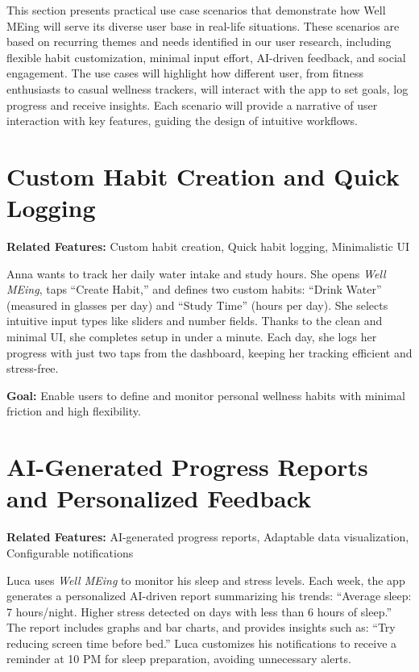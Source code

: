 This section presents practical use case scenarios that demonstrate how Well MEing will serve its diverse user base in real-life situations. 
These scenarios are based on recurring themes and needs identified in our user research, including flexible habit customization, minimal input effort, AI-driven feedback, and social engagement. 
The use cases will highlight how different user, from fitness enthusiasts to casual wellness trackers, will interact with the app to set goals, log progress and receive insights. 
Each scenario will provide a narrative of user interaction with key features, guiding the design of intuitive workflows.

\section{Custom Habit Creation and Quick Logging}

\textbf{Related Features:} Custom habit creation, Quick habit logging, Minimalistic UI

\vspace{0.3cm}
\noindent
Anna wants to track her daily water intake and study hours. She opens \textit{Well MEing}, taps ``Create Habit,'' and defines two custom habits: ``Drink Water'' (measured in glasses per day) and ``Study Time'' (hours per day). She selects intuitive input types like sliders and number fields. Thanks to the clean and minimal UI, she completes setup in under a minute. Each day, she logs her progress with just two taps from the dashboard, keeping her tracking efficient and stress-free.

\vspace{0.2cm}
\noindent
\textbf{Goal:} Enable users to define and monitor personal wellness habits with minimal friction and high flexibility.

\section{AI-Generated Progress Reports and Personalized Feedback}

\textbf{Related Features:} AI-generated progress reports, Adaptable data visualization, Configurable notifications

\vspace{0.3cm}
\noindent
Luca uses \textit{Well MEing} to monitor his sleep and stress levels. Each week, the app generates a personalized AI-driven report summarizing his trends: ``Average sleep: 7 hours/night. Higher stress detected on days with less than 6 hours of sleep.'' The report includes graphs and bar charts, and provides insights such as: ``Try reducing screen time before bed.'' Luca customizes his notifications to receive a reminder at 10 PM for sleep preparation, avoiding unnecessary alerts.

